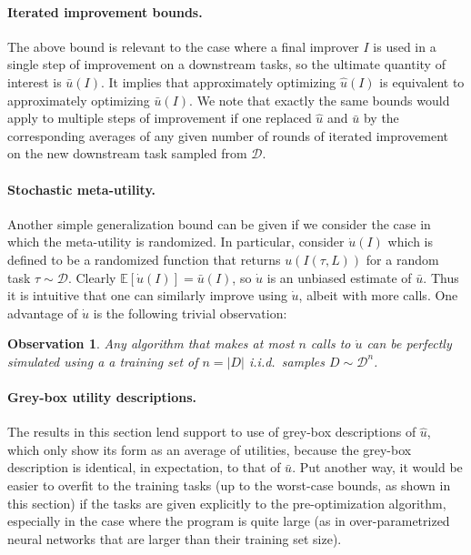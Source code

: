 \documentclass{article}
\newtheorem{observation}{Observation}
\newcommand{\E}{\mathbb{E}}
\newcommand{\metautil}{{\hat{u}}}
\newcommand{\exputil}{{\bar{u}}}
\newcommand{\randutil}{{\dot{u}}}
\newcommand{\D}{{\mathcal{D}}}
\begin{document}
\paragraph{Iterated improvement bounds.} The above bound is relevant to the case where a final improver $I$ is used in a single step of improvement on a downstream tasks, so the ultimate quantity of interest is $\exputil(I)$. It implies that approximately optimizing $\metautil(I)$ is equivalent to approximately optimizing $\exputil(I)$. We note that exactly the same bounds would apply to multiple steps of improvement if one replaced $\metautil$ and $\exputil$ by the corresponding averages of any given number of rounds of iterated improvement on the new downstream task sampled from $\D$. 

\paragraph{Stochastic meta-utility.} Another simple generalization bound can be given if we consider the case in which the meta-utility is randomized. In particular, consider $\randutil(I)$ which is defined to be a randomized function that returns $u(I(\tau, L))$ for a random task $\tau \sim \D$. Clearly $\E[\randutil(I)]=\exputil(I)$, so $\randutil$ is an unbiased estimate of $\exputil$. Thus it is intuitive that one can similarly improve using $\randutil$, albeit with more calls. One advantage of $\randutil$ is the following trivial observation:
\begin{observation}
    Any algorithm that makes at most $n$ calls to $\randutil$ can be perfectly simulated using a a training set of $n=|D|$ i.i.d.\ samples $D \sim \D^n$.
\end{observation}

\paragraph{Grey-box utility descriptions.} The results in this section lend support to use of grey-box descriptions of $\metautil$, which only show its form as an average of utilities, because the grey-box description is identical, in expectation, to that of $\exputil$. Put another way, it would be easier to overfit to the training tasks (up to the worst-case bounds, as shown in this section) if the tasks are given explicitly to the pre-optimization algorithm, especially in the case where the program is quite large (as in over-parametrized neural networks that are larger than their training set size).
\end{document}
